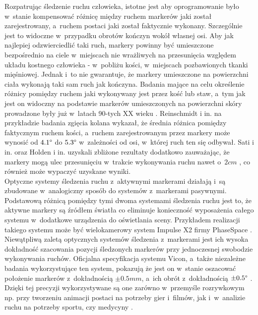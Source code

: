 Rozpatrując śledzenie ruchu człowieka, istotne jest aby oprogramowanie było w~stanie kompensować różnicę między ruchem markerów jaki został zarejestrowany, a~ruchem postaci jaki został faktycznie wykonany. Szczególnie jest to widoczne w~przypadku obrotów kończyn wokół własnej osi. Aby jak najlepiej odzwierciedlić taki ruch, markery powinny być umieszczone bezpośrednio na ciele w~miejscach nie wrażliwych na przesunięcia względem układu kostnego człowieka - w~pobliżu kości, w~miejscach pozbawionych tkanki mięśniowej. Jednak i~to nie gwarantuje, że markery umieszczone na powierzchni ciała wykonają taki sam ruch jak kończyna. Badania mające na celu określenie różnicy pomiędzy ruchem jaki wykonywany jest przez kość lub staw, a~tym jak jest on widoczny na podstawie markerów umieszczonych na powierzchni skóry prowadzone były już w~latach 90-tych XX wieku \cite{Sati2016,Reinschmidt2016,Holden2016}. Reinschmidt i in. \cite{Reinschmidt2016} na przykładzie badania zgięcia kolana wykazał, że średnia różnica pomiędzy faktycznym ruchem kości, a~ruchem zarejestrowanym przez markery może wynosić od $4.1\degree$ do $5.3\degree$ w~zależności od osi, w~której ruch ten się odbywał. Sati i in. \cite{Sati2016} oraz Holden i in. \cite{Holden2016} uzyskali zbliżone rezultaty dodatkowo zauważając, że markery mogą ulec przesunięciu w~trakcie wykonywania ruchu nawet o~$2cm$ \cite{Sati2016}, co również może wypaczyć uzyskane wyniki.\\ 

Optyczne systemy śledzenia ruchu z~aktywnymi markerami działają i~są zbudowane w~analogiczny sposób do systemów z~markerami pasywnymi. Podstawową różnicą pomiędzy tymi dwoma systemami śledzenia ruchu jest to, że aktywne markery są źródłem światła co eliminuje konieczność wyposażenia całego systemu w~dodatkowe urządzenia do oświetlania sceny. Przykładem realizacji takiego systemu może być wielokamerowy system Impulse X2 firmy PhaseSpace \cite{PhaseSpaceWebsite}.\\

Niewątpliwą zaletą optycznych systemów śledzenia z~markerami jest ich wysoka dokładność szacowania pozycji śledzonych markerów przy jednoczesnej swobodzie wykonywania ruchów. Oficjalna specyfikacja systemu Vicon, a~także niezależne badania wykorzystujące ten system, pokazują że jest on w~stanie oszacować położenie markerów z~dokładnością $\pm0.5mm$, a~ich obrót z~dokładnością $\pm0.5 \degree$ \cite{ViconSpec, Windolf2008}. Dzięki tej precyzji wykorzystywane są one zarówno w~przemyśle rozrywkowym np. przy tworzeniu animacji postaci na potrzeby gier i~filmów, jak i~w~analizie ruchu na potrzeby sportu, czy medycyny \cite{Even-zohar1984}. 

